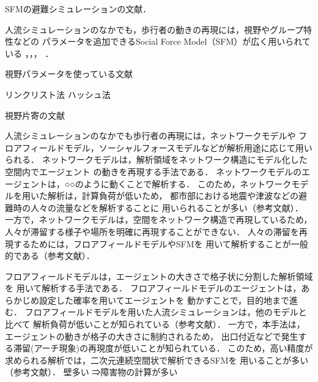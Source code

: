 SFMの避難シミュレーションの文献\cite{sfm_hinan1}\cite{sfm_hinan2}\cite{sfm_hinan3}．

人流シミュレーションのなかでも，歩行者の動きの再現には，視野やグループ特性などの
パラメータを追加できるSocial Force Model（SFM）が広く用いられている
\cite{helbing_sfm}，\cite{sfm_ntt}，\cite{sfm_para1}，\cite{intro_gunshu}
．

視野パラメータを使っている文献\cite{siya_ex2}\cite{siya_ex3}\cite{siya_ex4}\cite{siya_ex5}\cite{siya_ex6}\cite{siya_ex7}



リンクリスト法\cite{cell_book1}\cite{cell_book}\cite{cellrenketu}
ハッシュ法\cite{hash}

視野片寄の文献\cite{katayose}


人流シミュレーションのなかでも歩行者の再現には，ネットワークモデルや
フロアフィールドモデル，ソーシャルフォースモデルなどが解析用途に応じて用いられる．
ネットワークモデルは，解析領域をネットワーク構造にモデル化した空間内でエージェント
の動きを再現する手法である．
ネットワークモデルのエージェントは，○○のように動くことで解析する．
このため，ネットワークモデルを用いた解析は，計算負荷が低いため，
都市部における地震や津波などの避難時の人々の流量などを解析することに
用いられることが多い（参考文献）．
一方で，ネットワークモデルは，空間をネットワーク構造で再現しているため，
人々が滞留する様子や場所を明確に再現することができない．
人々の滞留を再現するためには，フロアフィールドモデルやSFMを
用いて解析することが一般的である（参考文献）．



フロアフィールドモデルは，エージェントの大きさで格子状に分割した解析領域を
用いて解析する手法である．
フロアフィールドモデルのエージェントは，あらかじめ設定した確率を用いてエージェントを
動かすことで，目的地まで進む．
フロアフィールドモデルを用いた人流シミュレーションは，他のモデルと比べて
解析負荷が低いことが知られている（参考文献）．
一方で，本手法は，エージェントの動きが格子の大きさに制約されるため，
出口付近などで発生する滞留(アーチ現象)の再現度が低いことが知られている．
このため，高い精度が求められる解析では，二次元連続空間状で解析できるSFMを
用いることが多い（参考文献）．
壁多い
⇒障害物の計算が多い


